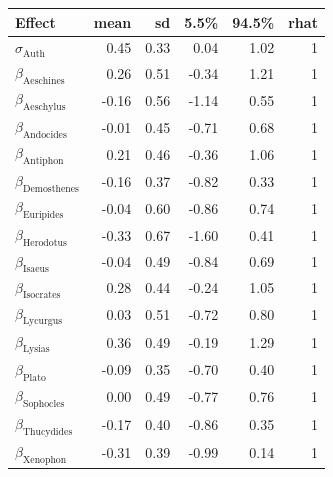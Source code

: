 
\begin{tabular}[t]{lrrrrr}
\toprule
Effect & mean & sd & 5.5\% & 94.5\% & rhat\\
\midrule
$\sigma_{\text{Auth}}$ & 0.45 & 0.33 & 0.04 & 1.02 & 1\\
$\beta_{\text{Aeschines}}$ & 0.26 & 0.51 & -0.34 & 1.21 & 1\\
$\beta_{\text{Aeschylus}}$ & -0.16 & 0.56 & -1.14 & 0.55 & 1\\
$\beta_{\text{Andocides}}$ & -0.01 & 0.45 & -0.71 & 0.68 & 1\\
$\beta_{\text{Antiphon}}$ & 0.21 & 0.46 & -0.36 & 1.06 & 1\\
\addlinespace
$\beta_{\text{Demosthenes}}$ & -0.16 & 0.37 & -0.82 & 0.33 & 1\\
$\beta_{\text{Euripides}}$ & -0.04 & 0.60 & -0.86 & 0.74 & 1\\
$\beta_{\text{Herodotus}}$ & -0.33 & 0.67 & -1.60 & 0.41 & 1\\
$\beta_{\text{Isaeus}}$ & -0.04 & 0.49 & -0.84 & 0.69 & 1\\
$\beta_{\text{Isocrates}}$ & 0.28 & 0.44 & -0.24 & 1.05 & 1\\
\addlinespace
$\beta_{\text{Lycurgus}}$ & 0.03 & 0.51 & -0.72 & 0.80 & 1\\
$\beta_{\text{Lysias}}$ & 0.36 & 0.49 & -0.19 & 1.29 & 1\\
$\beta_{\text{Plato}}$ & -0.09 & 0.35 & -0.70 & 0.40 & 1\\
$\beta_{\text{Sophocles}}$ & 0.00 & 0.49 & -0.77 & 0.76 & 1\\
$\beta_{\text{Thucydides}}$ & -0.17 & 0.40 & -0.86 & 0.35 & 1\\
\addlinespace
$\beta_{\text{Xenophon}}$ & -0.31 & 0.39 & -0.99 & 0.14 & 1\\
\bottomrule
\end{tabular}
